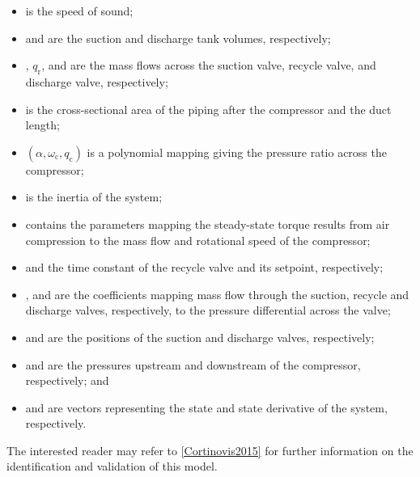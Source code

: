 \begin{itemize}[noitemsep]
  \item {} is the speed of sound;
  \item {} and  are the suction and discharge tank volumes, respectively;
  \item {}, $q_\text{r}$, and  are the mass flows across the suction valve, recycle valve, and discharge valve, respectively;
  \item {} is the cross-sectional area of the piping after the compressor and  the duct length;
  \item {}$\left(\alpha,\omega_\text{c}, q_\text{c} \right)$ is a polynomial mapping giving the pressure ratio across the compressor;
  \item {} is the inertia of the system;
  \item {} contains the parameters mapping the steady-state torque results from air compression to the mass flow and rotational speed of the compressor;
  \item {} and  the time constant of the recycle valve and its setpoint, respectively;
  \item {},  and  are the coefficients mapping mass flow through the suction, recycle and discharge valves, respectively, to the pressure differential across the valve;
  \item {} and  are the positions of the suction and discharge valves, respectively;
  \item {} and  are the pressures upstream and downstream of the compressor, respectively; and
  \item {} and  are vectors representing the state and state derivative of the system, respectively.
\end{itemize}

The interested reader may refer to \ref{Cortinovis2015} for further information on the identification and validation of this model.



